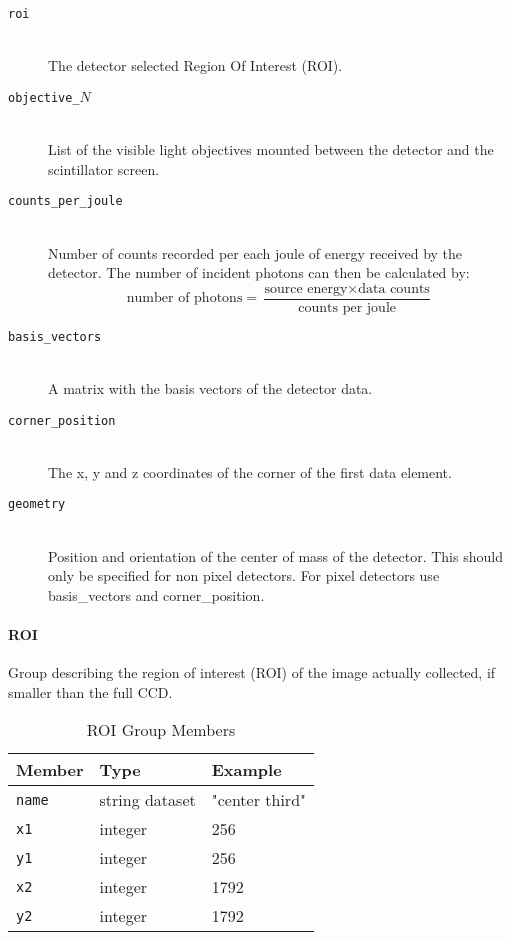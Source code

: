 \begin{description}
\item[\tt{roi}] \hfill \\
{The detector selected Region Of Interest (ROI).}

\item[\tt{objective\_$N$}] \hfill \\
{List of the visible light objectives mounted between the detector and the scintillator screen.}

\item[\tt{counts\_per\_joule}] \hfill \\
{Number of counts recorded per each joule of energy received by the detector. The number of incident photons can then be calculated by:
\begin{equation*}
\text{number of photons} = \frac{\text{source energy} \times \text{data counts}}{\text{counts per joule}}
\end{equation*}
}

\item[\tt{basis\_vectors}] \hfill \\
{A matrix with the basis vectors of the detector data.}

\item[\tt{corner\_position}] \hfill \\
{The x, y and z coordinates of the corner of the first data element. }

\item[\tt{geometry}] \hfill \\
{Position and orientation of the center of mass of the detector. This should only be specified for non pixel detectors. For pixel detectors use basis\_vectors and corner\_position.}

\end{description}

\paragraph{ROI}
\label{table:roi}

Group describing the region of interest (ROI) of the image actually collected, if smaller than the full CCD.

\begin{table}[h!]\sffamily \footnotesize
\caption{ROI Group Members}
\centering
{}
\begin{tabular}{l l l}
\toprule
\bfseries Member     & \bfseries Type & \bfseries Example \\
\midrule
\tt{name} & string dataset & "center third" \\ 
\tt{x1} & integer & 256  \\   
\tt{y1} & integer &  256  \\
\tt{x2} & integer & 1792  \\
\tt{y2} & integer & 1792  \\
\bottomrule
\end{tabular}
\end{table}


